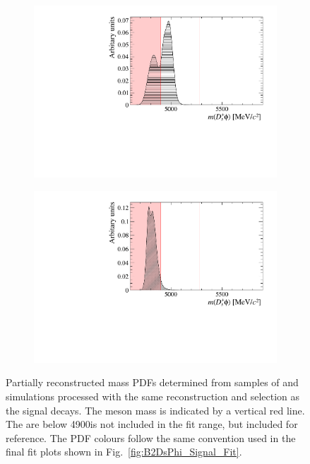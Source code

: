 \begin{figure}[!h]
    \centering
    \begin{subfigure}[t]{0.49\textwidth}
        \includegraphics[width=1.0\textwidth]{figs/B2DsPhi/Bs2DsDs_4600_5900_Shape.pdf}
        \caption{\decay{\Bsb}{\Dsp\Dsm} }
    \end{subfigure}
    \begin{subfigure}[t]{0.49\textwidth}
        \includegraphics[width=1.0\textwidth]{figs/B2DsPhi/Bs2DsstDs_4600_5900_Shape.pdf}
        \caption{\decay{\Bsb}{\Dssp\Dsm} }
    \end{subfigure}
    \caption{Partially reconstructed mass PDFs determined from samples of \decay{\Bsb}{\Dsp\Dsm} and \decay{\Bsb}{\Dssp\Dsm} simulations processed with the same reconstruction and selection as the signal decays. The \Bp meson mass is indicated by a vertical red line. The are below 4900\mevcc is not included in the fit range, but included for reference. The PDF colours follow the same convention used in the final fit plots shown in Fig.~\ref{fig:B2DsPhi_Signal_Fit}.}
    \label{fig:B2DsPhi_part_reco_shapes_DsDs}   
\end{figure}

